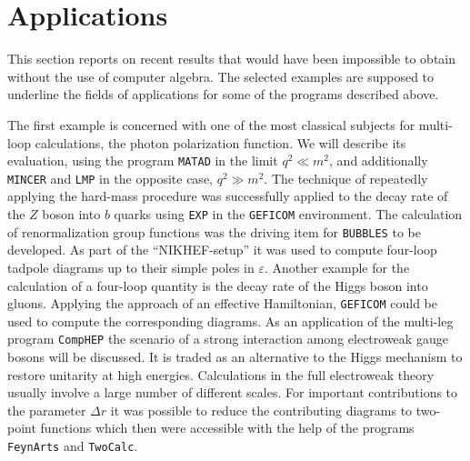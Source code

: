 
\section{Applications\label{secapplications}}
%
This section reports on recent results that would have been impossible
to obtain without the use of computer algebra. The selected examples are
supposed to underline the fields of applications for some of the
programs described above.

The first example is concerned with one of the most classical subjects
for multi-loop calculations, the photon polarization function. We will
describe its evaluation, using the program {\tt MATAD} in the limit
$q^2\ll m^2$, and additionally {\tt MINCER} and {\tt LMP} in the
opposite case, $q^2\gg m^2$.
The technique of repeatedly applying the hard-mass procedure was
successfully applied to the decay rate of the $Z$ boson into $b$ quarks
using {\tt EXP} in the {\tt GEFICOM} environment.
The calculation of renormalization group functions was the
driving item for {\tt BUBBLES} to be developed.
As part of the ``NIKHEF-setup'' it was used to compute four-loop
tadpole diagrams up to their simple poles in $\varepsilon$.
Another example for the calculation of a four-loop quantity is the decay
rate of the Higgs boson into gluons. Applying the approach of an effective
Hamiltonian, {\tt GEFICOM} could be used to compute the corresponding
diagrams.
As an application of the multi-leg program {\tt CompHEP} the
scenario of a strong interaction among electroweak gauge bosons will be
discussed. It is traded as an alternative to the Higgs mechanism to
restore unitarity at high energies.
Calculations in the full electroweak theory usually involve a large
number of different scales. For important contributions to the parameter
$\Delta r$ it was possible to reduce the contributing diagrams
to two-point functions which then were accessible with the help of the
programs {\tt FeynArts} and {\tt TwoCalc}.


